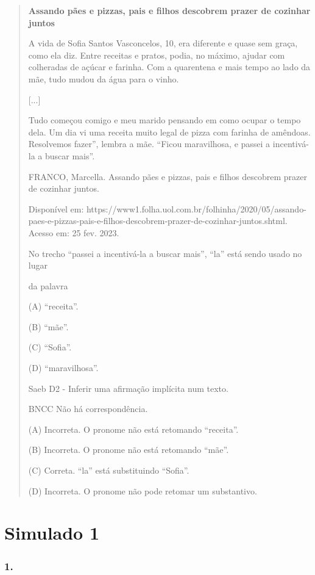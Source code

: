 \begin{quote}
\textbf{Assando pães e pizzas, pais e filhos descobrem prazer de
cozinhar juntos}

A vida de Sofia Santos Vasconcelos, 10, era diferente e quase sem graça,
como ela diz. Entre receitas e pratos, podia, no máximo, ajudar com
colheradas de açúcar e farinha. Com a quarentena e mais tempo ao lado da
mãe, tudo mudou da água para o vinho.

{[}...{]}

Tudo começou comigo e meu marido pensando em como ocupar o tempo dela.
Um dia vi uma receita muito legal de pizza com farinha de amêndoas.
Resolvemos fazer'', lembra a mãe. ``Ficou maravilhosa, e passei a
incentivá-la a buscar mais''.

FRANCO, Marcella. Assando pães e pizzas, pais e filhos descobrem prazer
de cozinhar juntos.

Disponível em:
https://www1.folha.uol.com.br/folhinha/2020/05/assando-paes-e-pizzas-pais-e-filhos-descobrem-prazer-de-cozinhar-juntos.shtml.
Acesso em: 25 fev. 2023.

No trecho ``passei a incentivá-la a buscar mais'', ``la'' está sendo
usado no lugar

da palavra

(A) ``receita''.

(B) ``mãe''.

(C) ``Sofia''.

(D) ``maravilhosa''.

Saeb D2 - Inferir uma afirmação implícita num texto.

BNCC Não há correspondência.

(A) Incorreta. O pronome não está retomando ``receita''.

(B) Incorreta. O pronome não está retomando ``mãe''.

(C) Correta. ``la'' está substituindo ``Sofia''.

(D) Incorreta. O pronome não pode retomar um substantivo.
\end{quote}

\section{Simulado 1}\label{simulado-1}

\subsubsection{1. }\label{section-80}

